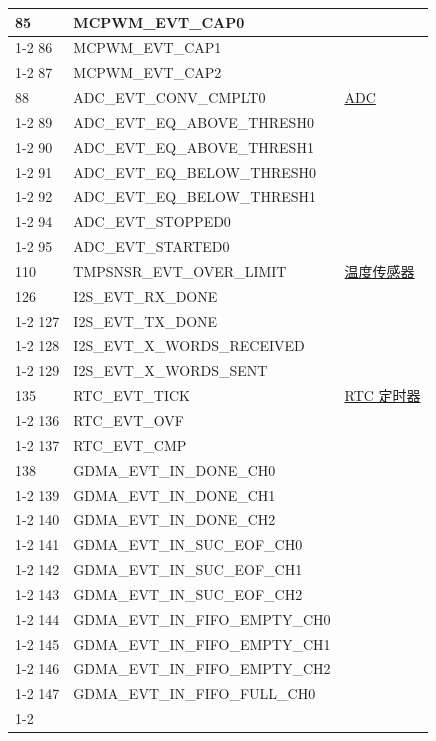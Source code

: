 \documentclass[main\_\_CN.tex]{subfiles}
\begin{document}
\begin{longtable}{ | l | l | l | }
85  & MCPWM\_EVT\_CAP0   & \\ \cline{1-2}
86  & MCPWM\_EVT\_CAP1   & \\ \cline{1-2}
87  & MCPWM\_EVT\_CAP2   & \\ \hline
88  & ADC\_EVT\_CONV\_CMPLT0    & \hyperref[mod:adc]{ADC}   \\ \cline{1-2}
89  & ADC\_EVT\_EQ\_ABOVE\_THRESH0     & \\ \cline{1-2}
90  & ADC\_EVT\_EQ\_ABOVE\_THRESH1     & \\ \cline{1-2}
91  & ADC\_EVT\_EQ\_BELOW\_THRESH0     & \\ \cline{1-2}
92  & ADC\_EVT\_EQ\_BELOW\_THRESH1     & \\ \cline{1-2}
94  & ADC\_EVT\_STOPPED0 & \\ \cline{1-2}
95  & ADC\_EVT\_STARTED0 & \\ \hline
110 & TMPSNSR\_EVT\_OVER\_LIMIT & \hyperref[mod:tmpsen]{温度传感器}  \\ \hline
126 & I2S\_EVT\_RX\_DONE & \nameref{mod:i2s}   \\ \cline{1-2}
127 & I2S\_EVT\_TX\_DONE & \\ \cline{1-2}
128 & I2S\_EVT\_X\_WORDS\_RECEIVED     & \\ \cline{1-2}
129 & I2S\_EVT\_X\_WORDS\_SENT  & \\ \hline
135 & RTC\_EVT\_TICK     & \hyperref[mod:lowpowm]{RTC 定时器}   \\ \cline{1-2}
136 & RTC\_EVT\_OVF      & \\ \cline{1-2}
137 & RTC\_EVT\_CMP      & \\ \hline
138 & GDMA\_EVT\_IN\_DONE\_CH0  & \nameref{mod:dma} \\ \cline{1-2}
139 & GDMA\_EVT\_IN\_DONE\_CH1  & \\ \cline{1-2}
140 & GDMA\_EVT\_IN\_DONE\_CH2  & \\ \cline{1-2}
141 & GDMA\_EVT\_IN\_SUC\_EOF\_CH0     & \\ \cline{1-2}
142 & GDMA\_EVT\_IN\_SUC\_EOF\_CH1     & \\ \cline{1-2}
143 & GDMA\_EVT\_IN\_SUC\_EOF\_CH2     & \\ \cline{1-2}
144 & GDMA\_EVT\_IN\_FIFO\_EMPTY\_CH0  & \\ \cline{1-2}
145 & GDMA\_EVT\_IN\_FIFO\_EMPTY\_CH1  & \\ \cline{1-2}
146 & GDMA\_EVT\_IN\_FIFO\_EMPTY\_CH2  & \\ \cline{1-2}
147 & GDMA\_EVT\_IN\_FIFO\_FULL\_CH0   & \\ \cline{1-2}

\end{longtable}
\end{document}
